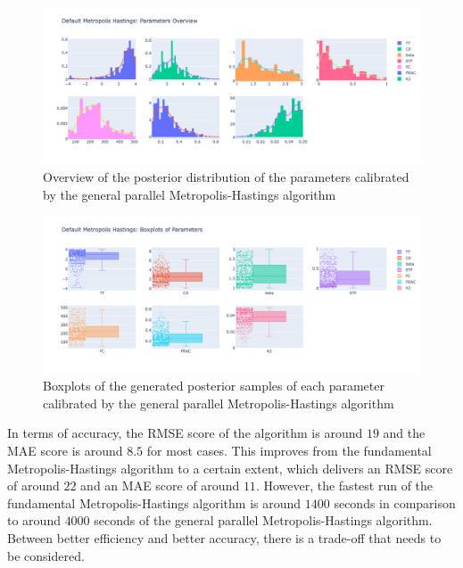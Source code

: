 \begin{figure}[H]
    \centering
    \includegraphics[width=1\textwidth]{figures/gpmh/parameter_overview.png}
    \captionsetup{width=.8\textwidth}
    \caption{Overview of the posterior distribution of the parameters calibrated by the general parallel Metropolis-Hastings algorithm}
    \label{fig:enter-label}
\end{figure}

\begin{figure}[H]
    \centering
    \includegraphics[width=1\textwidth]{figures/gpmh/boxplot.png}
    \captionsetup{width=.8\textwidth}
    \caption{Boxplots of the generated posterior samples of each parameter calibrated by the general parallel Metropolis-Hastings algorithm}
    \label{fig:enter-label}
\end{figure}

In terms of accuracy, the RMSE score of the algorithm is around $19$ and the MAE score is around $8.5$ for most cases. This improves from the fundamental Metropolis-Hastings algorithm to a certain extent, which delivers an RMSE score of around $22$ and an MAE score of around $11$. However, the fastest run of the fundamental Metropolis-Hastings algorithm is around $1400$ seconds in comparison to around $4000$ seconds of the general parallel Metropolis-Hastings algorithm. Between better efficiency and better accuracy, there is a trade-off that needs to be considered.

